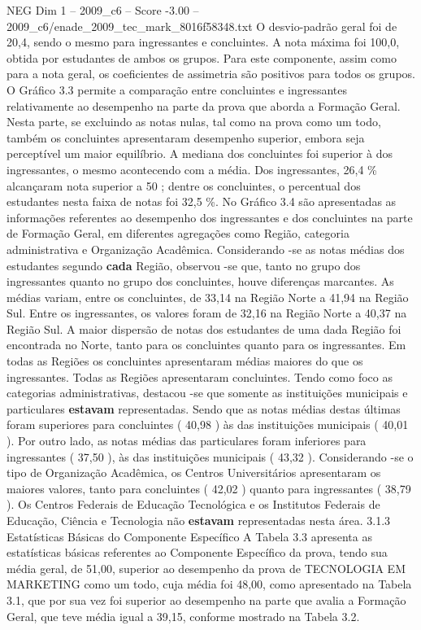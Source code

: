 \begin{textsample}{NEG Dim 1 – 2009\_c6 – Score -3.00 – 2009\_c6/enade\_2009\_tec\_mark\_8016f58348.txt}
O desvio-padrão geral foi de 20,4, sendo o mesmo para ingressantes e concluintes.
A nota máxima foi 100,0, obtida por estudantes de ambos os grupos.
Para este componente, assim como para a nota geral, os coeficientes de assimetria são positivos para todos os grupos.
O Gráfico 3.3 permite a comparação entre concluintes e ingressantes relativamente ao desempenho na parte da prova que aborda a Formação Geral.
Nesta parte, se excluindo as notas nulas, tal como na prova como um todo, também os concluintes apresentaram desempenho superior, embora seja perceptível um maior equilíbrio.
A mediana dos concluintes foi superior à dos ingressantes, o mesmo acontecendo com a média.
Dos ingressantes, 26,4 \% alcançaram nota superior a 50 ; dentre os concluintes, o percentual dos estudantes nesta faixa de notas foi 32,5 \%.
No Gráfico 3.4 são apresentadas as informações referentes ao desempenho dos ingressantes e dos concluintes na parte de Formação Geral, em diferentes agregações como Região, categoria administrativa e Organização Acadêmica.
Considerando -se as notas médias dos estudantes segundo \textbf{cada} Região, observou -se que, tanto no grupo dos ingressantes quanto no grupo dos concluintes, houve diferenças marcantes.
As médias variam, entre os concluintes, de 33,14 na Região Norte a 41,94 na Região Sul.
Entre os ingressantes, os valores foram de 32,16 na Região Norte a 40,37 na Região Sul.
A maior dispersão de notas dos estudantes de uma dada Região foi encontrada no Norte, tanto para os concluintes quanto para os ingressantes.
Em todas as Regiões os concluintes apresentaram médias maiores do que os ingressantes.
Todas as Regiões apresentaram concluintes.
Tendo como foco as categorias administrativas, destacou -se que somente as instituições municipais e particulares \textbf{estavam} representadas.
Sendo que as notas médias destas últimas foram superiores para concluintes ( 40,98 ) às das instituições municipais ( 40,01 ).
Por outro lado, as notas médias das particulares foram inferiores para ingressantes ( 37,50 ), às das instituições municipais ( 43,32 ).
Considerando -se o tipo de Organização Acadêmica, os Centros Universitários apresentaram os maiores valores, tanto para concluintes ( 42,02 ) quanto para ingressantes ( 38,79 ).
Os Centros Federais de Educação Tecnológica e os Institutos Federais de Educação, Ciência e Tecnologia não \textbf{estavam} representadas nesta área. 3.1.3 Estatísticas Básicas do Componente Específico A Tabela 3.3 apresenta as estatísticas básicas referentes ao Componente Específico da prova, tendo sua média geral, de 51,00, superior ao desempenho da prova de TECNOLOGIA EM MARKETING como um todo, cuja média foi 48,00, como apresentado na Tabela 3.1, que por sua vez foi superior ao desempenho na parte que avalia a Formação Geral, que teve média igual a 39,15, conforme mostrado na Tabela 3.2.

\end{textsample}
